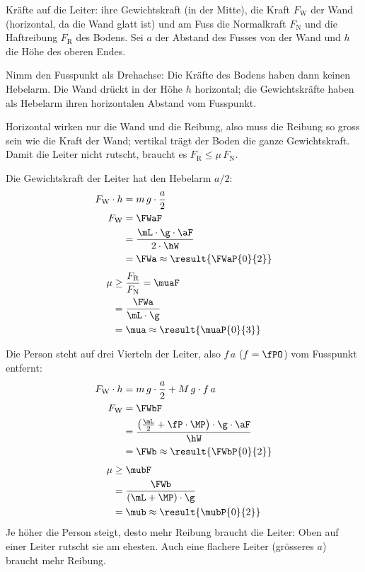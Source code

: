 Kräfte auf die Leiter: ihre Gewichtskraft (in der Mitte), die Kraft $F_\mathrm{W}$ der Wand (horizontal, da die Wand glatt ist) und am Fuss die Normalkraft $F_\mathrm{N}$ und die Haftreibung $F_\mathrm{R}$ des Bodens. Sei $a$ der Abstand des Fusses von der Wand und $h$ die Höhe des oberen Endes.

Nimm den Fusspunkt als Drehachse: Die Kräfte des Bodens haben dann keinen Hebelarm. Die Wand drückt in der Höhe $h$ horizontal; die Gewichtskräfte haben als Hebelarm ihren horizontalen Abstand vom Fusspunkt.

Horizontal wirken nur die Wand und die Reibung, also muss die Reibung so gross sein wie die Kraft der Wand; vertikal trägt der Boden die ganze Gewichtskraft. Damit die Leiter nicht rutscht, braucht es $F_\mathrm{R}\le\mu\,F_\mathrm{N}$.

\begin{abcliste}
\abc
Die Gewichtskraft der Leiter hat den Hebelarm $a/2$:
\begin{align}
 F_\mathrm{W}\cdot h &= m\,g\cdot\frac{a}{2} \\
 F_\mathrm{W} &= \FWaF \\
   &= \frac{\mL\cdot\g\cdot\aF}{2\cdot\hW} \\
   &= \FWa \approx \result{\FWaP{0}{2}}
\end{align}
\begin{align}
 \mu &\ge \frac{F_\mathrm{R}}{F_\mathrm{N}} = \muaF \\
   &= \frac{\FWa}{\mL\cdot\g} \\
   &= \mua \approx \result{\muaP{0}{3}}
\end{align}

\abc
Die Person steht auf drei Vierteln der Leiter, also $f\,a$ ($f = \fPO$) vom Fusspunkt entfernt:
\begin{align}
 F_\mathrm{W}\cdot h &= m\,g\cdot\frac{a}{2} + M\,g\cdot f\,a \\
 F_\mathrm{W} &= \FWbF \\
   &= \frac{\left(\frac{\mL}{2}+\fP\cdot\MP\right)\cdot\g\cdot\aF}{\hW} \\
   &= \FWb \approx \result{\FWbP{0}{2}}
\end{align}
\begin{align}
 \mu &\ge \mubF \\
   &= \frac{\FWb}{(\mL+\MP)\cdot\g} \\
   &= \mub \approx \result{\mubP{0}{2}}
\end{align}
Je höher die Person steigt, desto mehr Reibung braucht die Leiter: Oben auf einer Leiter rutscht sie am ehesten. Auch eine flachere Leiter (grösseres $a$) braucht mehr Reibung.
\end{abcliste}
